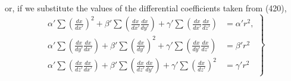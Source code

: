 \documentclass[12pt]{article}
\begin{document}
{or, if we substitute the values of the differential coefficients taken from (420),
\begin{equation} \left. \begin{aligned}
\alpha' \sum \left( \frac{dx}{dx'} \right)^2 +              \beta' \sum \left( \frac{dx}{dx'}\frac{dx}{dy'} \right)   + \gamma' \sum \left( \frac{dx}{dx'}\frac{dx}{dz'} \right) &= \alpha' r^2, \\
\alpha' \sum \left(  \frac{dx}{dy'}\frac{dx}{dx'} \right) + \beta' \sum \left( \frac{dx}{dy'} \right)^2   +             \gamma' \sum \left( \frac{dx}{dy'}\frac{dx}{dz'} \right) &=  \beta'r^2 \\
\alpha' \sum \left(  \frac{dx}{dz'}\frac{dx}{dx'} \right) + \beta' \sum \left( \frac{dx}{dz'} \frac{dx}{dy'} \right)  + \gamma' \sum \left( \frac{dx}{dz'} \right)^2 &= \gamma' r^2
\end{aligned}
\right\}
\label{429}
\end{equation}

}
\end{document}
